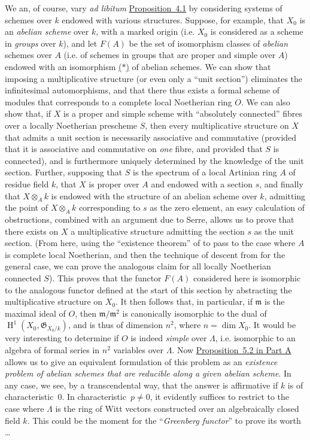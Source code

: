 \documentclass{article}
\newcommand{\fk}[1]{{\mathfrak{#1}}}
\DeclareMathOperator{\HH}{H}
\newcommand{\oldpage}[1]{\marginpar{\footnotesize$\Big\vert$ \textit{p.~#1}}}
\begin{document}
We an, of course, vary \emph{ad libitum} \hyperref[C.4-proposition1]{Proposition~4.1} by considering systems of schemes over $k$ endowed with various structures.
Suppose, for example, that $X_0$ is an \emph{abelian scheme} over $k$, with a marked origin (i.e. $X_0$ is considered as a scheme in \emph{groups} over $k$), and let $F(A)$ be the set of isomorphism classes of \emph{abelian} schemes over $A$ (i.e. of schemes in groups that are proper and simple over $A$) endowed with an isomorphism \hyperref[*]{($*$)} of abelian schemes.
We can show that imposing a multiplicative structure (or even only a ``unit section'') eliminates the infinitesimal automorphisms, and that there thus exists a formal scheme of modules that corresponds to a complete local Noetherian ring $O$.
We can also show that, if $X$ is a proper and simple scheme with ``absolutely connected'' fibres over a locally Noetherian prescheme $S$, then every multiplicative structure on $X$ that admits a unit section is necessarily associative and commutative (provided that it is associative and commutative on \emph{one} fibre, and provided that $S$ is connected), and is furthermore uniquely determined by the knowledge
\oldpage{195-19}
of the unit section.
Further, supposing that $S$ is the spectrum of a local Artinian ring $A$ of residue field $k$, that $X$ is proper over $A$ and endowed with a section $s$, and finally that $X\otimes_A k$ is endowed with the structure of an abelian scheme over $k$, admitting the point of $X\otimes_A k$ corresponding to $s$ as the zero element, an easy calculation of obstructions, combined with an argument due to Serre, allows us to prove that there exists on $X$ a multiplicative structure admitting the section $s$ as the unit section.
(From here, using the ``existence theorem'' of \cite{2} to pass to the case where $A$ is complete local Noetherian, and then the technique of descent from \cite{3} for the general case, we can prove the analogous claim for all locally Noetherian connected $S$).
This proves that the functor $F(A)$ considered here is isomorphic to the analogous functor defined at the start of this section by abstracting the multiplicative structure on $X_0$.
It then follows that, in particular, if $\fk{m}$ is the maximal ideal of $O$, then $\fk{m}/\fk{m}^2$ is canonically isomorphic to the dual of $\HH^1(X_0,\fk{G}_{X_0/k})$, and is thus of dimension $n^2$, where $n=\dim X_0$.
It would be very interesting to determine if $O$ is indeed \emph{simple} over $\Lambda$, i.e. isomorphic to an algebra of formal series in $n^2$ variables over $\Lambda$.
Now \hyperref[A.5-proposition2]{Proposition~5.2 in Part A} allows us to give an equivalent formulation of this problem as an \emph{existence problem of abelian schemes that are reducible along a given abelian scheme}.
In any case, we see, by a transcendental way, that the answer is affirmative if $k$ is of characteristic~$0$.
In characteristic~$p\neq0$, it evidently suffices to restrict to the case where $\Lambda$ is the ring of Witt vectors constructed over an algebraically closed field $k$.
This could be the moment for the ``\emph{Greenberg functor}'' to prove its worth \ldots
\end{document}
